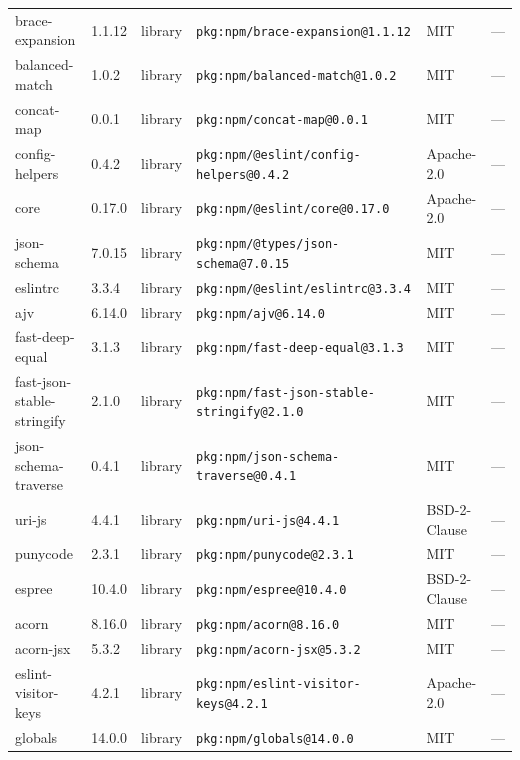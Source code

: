 \documentclass[11pt,a4paper]{article}
\begin{document}
\begin{longtable}{|p{4cm}|p{2cm}|p{1.6cm}|p{5cm}|p{1.5cm}|p{3.5cm}|}
\raggedright brace-expansion & 1.1.12 & library & \small\texttt{pkg:npm/brace-expansion@1.1.12} & MIT & \small — \\
\raggedright balanced-match & 1.0.2 & library & \small\texttt{pkg:npm/balanced-match@1.0.2} & MIT & \small — \\
\raggedright concat-map & 0.0.1 & library & \small\texttt{pkg:npm/concat-map@0.0.1} & MIT & \small — \\
\raggedright config-helpers & 0.4.2 & library & \small\texttt{pkg:npm/@eslint/config-helpers@0.4.2} & Apache-2.0 & \small — \\
\raggedright core & 0.17.0 & library & \small\texttt{pkg:npm/@eslint/core@0.17.0} & Apache-2.0 & \small — \\
\raggedright json-schema & 7.0.15 & library & \small\texttt{pkg:npm/@types/json-schema@7.0.15} & MIT & \small — \\
\raggedright eslintrc & 3.3.4 & library & \small\texttt{pkg:npm/@eslint/eslintrc@3.3.4} & MIT & \small — \\
\raggedright ajv & 6.14.0 & library & \small\texttt{pkg:npm/ajv@6.14.0} & MIT & \small — \\
\raggedright fast-deep-equal & 3.1.3 & library & \small\texttt{pkg:npm/fast-deep-equal@3.1.3} & MIT & \small — \\
\raggedright fast-json-stable-stringify & 2.1.0 & library & \small\texttt{pkg:npm/fast-json-stable-stringify@2.1.0} & MIT & \small — \\
\raggedright json-schema-traverse & 0.4.1 & library & \small\texttt{pkg:npm/json-schema-traverse@0.4.1} & MIT & \small — \\
\raggedright uri-js & 4.4.1 & library & \small\texttt{pkg:npm/uri-js@4.4.1} & BSD-2-Clause & \small — \\
\raggedright punycode & 2.3.1 & library & \small\texttt{pkg:npm/punycode@2.3.1} & MIT & \small — \\
\raggedright espree & 10.4.0 & library & \small\texttt{pkg:npm/espree@10.4.0} & BSD-2-Clause & \small — \\
\raggedright acorn & 8.16.0 & library & \small\texttt{pkg:npm/acorn@8.16.0} & MIT & \small — \\
\raggedright acorn-jsx & 5.3.2 & library & \small\texttt{pkg:npm/acorn-jsx@5.3.2} & MIT & \small — \\
\raggedright eslint-visitor-keys & 4.2.1 & library & \small\texttt{pkg:npm/eslint-visitor-keys@4.2.1} & Apache-2.0 & \small — \\
\raggedright globals & 14.0.0 & library & \small\texttt{pkg:npm/globals@14.0.0} & MIT & \small — \\

\end{longtable}
\end{document}
